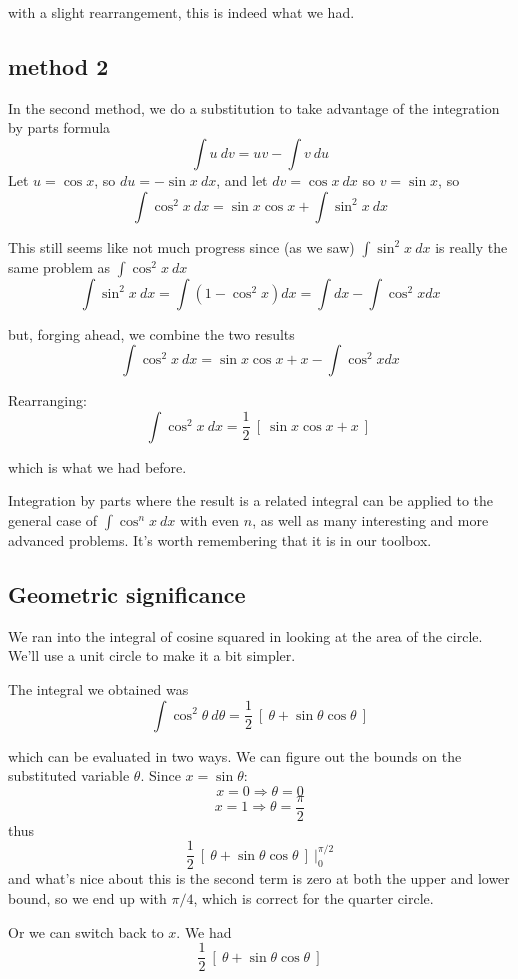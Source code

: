 \documentclass[11pt, oneside]{article}
\begin{document}
with a slight rearrangement, this is indeed what we had.

\subsection*{method 2}
In the second method, we do a substitution to take advantage of the integration by parts formula
\[ \int u \ dv = uv - \int v \ du \]
Let $u=\cos x$, so $du = -\sin x \ dx$, and let $dv = \cos x \ dx$ so $v= \sin x$, so
\[ \int \cos^2 x \ dx = \sin x \cos x + \int \sin^2 x \ dx \]

This still seems like not much progress since (as we saw) $\int \sin^2 x \ dx$ is really the same problem as $\int \cos^2 x \ dx$
\[ \int \sin^2 x \ dx = \int (1 - \cos^2 x) dx = \int dx - \int \cos^2 x dx \]

but, forging ahead, we combine the two results
\[ \int \cos^2 x \ dx = \sin x \cos x + x -  \int \cos^2 x dx \]

Rearranging:
\[ \int \cos^2 x \ dx  = \frac{1}{2} \ [ \ \sin x \cos x + x \ ] \ \]

which is what we had before.

Integration by parts where the result is a related integral can be applied to the general case of $\int \cos^n x \ dx$ with even $n$, as well as many interesting and more advanced problems.  It's worth remembering that it is in our toolbox.

\subsection*{Geometric significance}
We ran into the integral of cosine squared in looking at the area of the circle.  We'll use a unit circle to make it a bit simpler.

The integral we obtained was
\[ \int \cos^2 \theta \ d \theta = \frac{1}{2} \ [ \ \theta + \sin \theta \cos \theta \ ] \]

which can be evaluated in two ways.  We can figure out the bounds on the substituted variable $\theta$.  Since $x = \sin \theta$:
\[ x = 0 \Rightarrow \theta = 0 \]
\[ x = 1 \Rightarrow \theta = \frac{\pi}{2} \]
thus
\[ \frac{1}{2} \ [ \ \theta + \sin \theta \cos \theta \ ] \ \bigg |_0^{\pi/2} \]
and what's nice about this is the second term is zero at both the upper and lower bound, so we end up with $\pi/4$, which is correct for the quarter circle.

Or we can switch back to $x$.  We had
\[ \frac{1}{2} \ [ \ \theta + \sin \theta \cos \theta \ ] \]
\end{document}
